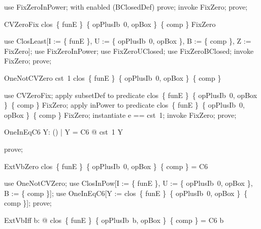 \documentclass{article}
\begin{document}
\begin{zproof}
use FixZeroInPower;
with enabled (BClosedDef) prove;
invoke FixZero;
prove;
\end{zproof}

\begin{theorem}{CVZeroFix}
  clos~\{ funE \}~\{ opPlusIb~0, opBox \}~\{ comp \} \subseteq FixZero
\end{theorem}

\begin{zproof}
use ClosLeast[I := \{ funE \}, U := \{ opPlusIb~0, opBox \}, B := \{ comp \}, Z := FixZero];
use FixZeroInPower;
use FixZeroUClosed;
use FixZeroBClosed;
invoke FixZero;
prove;
\end{zproof}

\begin{theorem}{OneNotCVZero}
  \lnot cst~1 \in clos~\{ funE \}~\{ opPlusIb~0, opBox \}~\{ comp \}
\end{theorem}

\begin{zproof}
use CVZeroFix;
apply subsetDef to predicate clos~\{ funE \}~\{ opPlusIb~0, opBox \}~\{ comp \} \subseteq FixZero;
apply inPower to predicate clos~\{ funE \}~\{ opPlusIb~0, opBox \}~\{ comp \} \in \power FixZero;
instantiate e == cst~1;
invoke FixZero;
prove;
\end{zproof}

\begin{theorem}{OneInEqC6}
  \forall Y: \power (\nat \fun \nat) | Y = C6 @ cst~1 \in Y
\end{theorem}

\begin{zproof}
prove;
\end{zproof}

\begin{theorem}{ExtVbZero}
  \lnot clos~\{ funE \}~\{ opPlusIb~0, opBox \}~\{ comp \} = C6
\end{theorem}

\begin{zproof}
use OneNotCVZero;
use ClosInPow[I := \{ funE \}, U := \{ opPlusIb~0, opBox \}, B := \{ comp \}];
use OneInEqC6[Y := clos~\{ funE \}~\{ opPlusIb~0, opBox \}~\{ comp \}];
prove;
\end{zproof}

\begin{theorem}{ExtVbIff}
  \forall b: \nat @ clos~\{ funE \}~\{ opPlusIb~b, opBox \}~\{ comp \} = C6  \leq b
\end{theorem}
\end{document}
